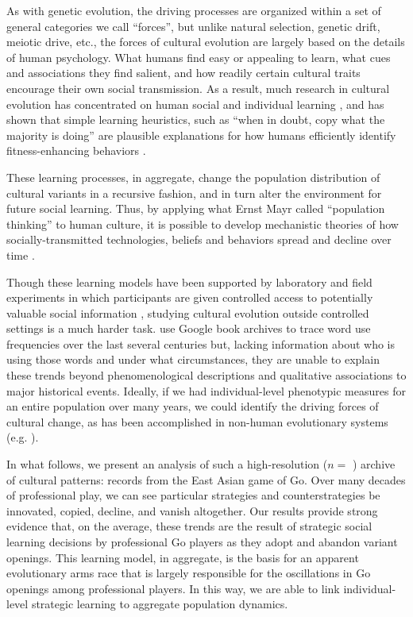 \documentclass[reqno,12pt]{amsart}
\begin{document}
As with genetic evolution, the driving processes are organized within a set of general categories we call ``forces'', but unlike natural selection, genetic drift, meiotic drive, etc., the forces of cultural evolution are largely based on the details of human psychology. What humans find easy or appealing to learn, what cues and associations they find salient, and how readily certain cultural traits encourage their own social transmission. As a result, much research in cultural evolution has concentrated on human social and individual learning \citep{mesoudi2006unified}, and has shown that simple learning heuristics, such as ``when in doubt, copy what the majority is doing'' are plausible explanations for how humans efficiently identify fitness-enhancing behaviors \citep{mcelreath2008successbias}.

These learning processes, in aggregate, change the population distribution of cultural variants in a recursive fashion, and in turn alter the environment for future social learning. Thus, by applying what Ernst Mayr called ``population thinking'' to human culture, it is possible to develop mechanistic theories of how socially-transmitted technologies, beliefs and behaviors spread and decline over time \citep{shennan2009pattern}.

Though these learning models have been supported by laboratory and field experiments in which participants are given controlled access to potentially valuable social information \citep{baum2004cultural, caldwell2008studying, efferson2007equality, mesoudi2011payoffbias}, studying cultural evolution outside controlled settings is a much harder task. \citet{michel2011quantitative} use Google book archives to trace word use frequencies over the last several centuries but, lacking information about who is using those words and under what circumstances, they are unable to explain these trends beyond phenomenological descriptions and qualitative associations to major historical events. Ideally, if we had individual-level phenotypic measures for an entire population over many years, we could identify the driving forces of cultural change, as has been accomplished in non-human evolutionary systems (e.g. \citet{grant2002unpredictable, ozgul2009dynamics}).

In what follows, we present an analysis of such a high-resolution ($n=$ \nGames) archive of cultural patterns: records from the East Asian game of Go. Over many decades of professional play, we can see particular strategies and counterstrategies be innovated, copied, decline, and vanish altogether. Our results provide strong evidence that, on the average, these trends are the result of strategic social learning decisions by professional Go players as they adopt and abandon variant openings. This learning model, in aggregate, is the basis for an apparent evolutionary arms race that is largely responsible for the oscillations in Go openings among professional players. In this way, we are able to link individual-level strategic learning to aggregate population dynamics.
\end{document}
